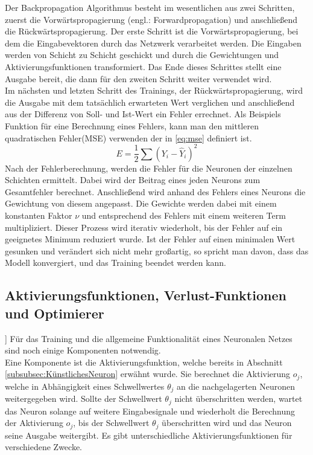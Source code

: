 Der Backpropagation Algorithmus besteht im wesentlichen aus zwei Schritten, zuerst die Vorwärtspropagierung (engl.: Forwardpropagation) und anschließend die Rückwärtspropagierung.
Der erste Schritt ist die Vorwärtspropagierung, bei dem die Eingabevektoren durch das Netzwerk verarbeitet werden. Die Eingaben werden von Schicht zu Schicht geschickt und durch die Gewichtungen und Aktivierungsfunktionen transformiert. Das Ende dieses Schrittes stellt eine Ausgabe bereit, die dann für den zweiten Schritt weiter verwendet wird. \\
Im nächsten und letzten Schritt des Trainings, der Rückwärtspropagierung, wird die Ausgabe mit dem tatsächlich erwarteten Wert verglichen und anschließend aus der Differenz von Soll- und Ist-Wert ein Fehler errechnet. Als Beispiels Funktion für eine Berechnung eines Fehlers, kann man den mittleren quadratischen Fehler(MSE) verwenden der in \ref{eq:mse} definiert ist.
\begin{equation}
	\label{eq:mse}
	E = \dfrac{1}{2} \sum (Y_i - \hat{Y}_{i})^2
\end{equation}
Nach der Fehlerberechnung, werden die Fehler für die Neuronen der einzelnen Schichten ermittelt. Dabei wird der Beitrag eines jeden Neurons zum Gesamtfehler berechnet. Anschließend wird anhand des Fehlers eines Neurons die Gewichtung von diesem angepasst. Die Gewichte werden dabei mit einem konstanten Faktor $\nu$ und entsprechend des Fehlers mit einem weiteren Term multipliziert. Dieser Prozess wird iterativ wiederholt, bis der Fehler auf ein geeignetes Minimum reduziert wurde. Ist der Fehler auf einen minimalen Wert gesunken und verändert sich nicht mehr großartig, so spricht man davon, dass das \gls{Modell} konvergiert, und das Training beendet werden kann.\cite[vgl.][]{Scherer1997}



\subsection{Aktivierungsfunktionen, Verlust-Funktionen und Optimierer}
\label{subsec:AktivierungsfunktionenVerlust-FunktionenOptimierer}]
Für das Training und die allgemeine Funktionalität eines Neuronalen Netzes sind noch einige Komponenten notwendig.\\
Eine Komponente ist die Aktivierungsfunktion, welche bereits in Abschnitt \ref{subsubsec:KünstlichesNeuron} erwähnt wurde. Sie berechnet die Aktivierung $o_j$, welche in Abhängigkeit eines Schwellwertes $\theta_j$ an die nachgelagerten Neuronen weitergegeben wird. Sollte der Schwellwert $\theta_j$ nicht überschritten werden, wartet das Neuron solange auf weitere Eingabesignale und wiederholt die Berechnung der Aktivierung $o_j$, bis der Schwellwert $\theta_j$ überschritten wird und das Neuron seine Ausgabe weitergibt. Es gibt unterschiedliche Aktivierungsfunktionen für verschiedene Zwecke.

